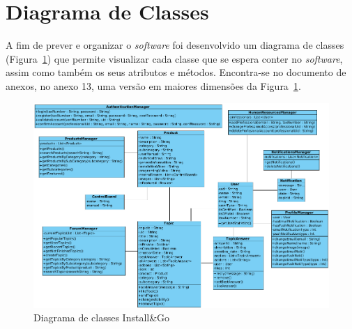 \section{Diagrama de Classes}

A fim de prever e organizar o \textit{software} foi desenvolvido um diagrama de classes (Figura~\ref{fig:22}) que permite visualizar cada classe que se espera conter no \textit{software}, assim como também os seus atributos e métodos. Encontra-se no documento de anexos, no anexo 13, uma versão em maiores dimensões da Figura~\ref*{fig:22}.

\begin{figure}[htb]
  \centering
  
  \includegraphics[width=\textwidth]{images/diagramas/diagrama_classes.png}
  \caption{Diagrama de classes Install\&Go}
  \label{fig:22}
\end{figure}
